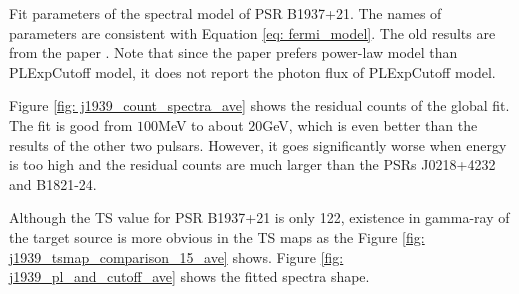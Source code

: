 \documentclass[12pt]{report}
\newcommand{\mycaption}[1]{\protect \caption{#1}}
\begin{document}
            \begin{table}[!ht]
              \centering
                \mycaption{Fit parameters of the spectral model of PSR B1937+21. 
                  The names of parameters are consistent with Equation
                  \ref{eq: fermi_model}. The old results are from the paper \cite{0004-637X-787-2-167}.
                  Note that since the paper prefers power-law model than PLExpCutoff model, it does not 
                  report the photon flux of PLExpCutoff model.}
                \label{table: j1939_fit_result_ave}        
            \end{table} 

            Figure \ref{fig: j1939_count_spectra_ave} shows the residual counts of the global fit.
            The fit is good from $100$MeV to about $20$GeV, which is even better than the results 
            of the other two pulsars. However, it goes significantly worse when energy is too 
            high and the residual counts are much larger than the PSRs J0218+4232 and B1821-24.

            Although the TS value for PSR B1937+21 is only 122, existence in gamma-ray of the 
            target source is more obvious in the TS maps as the Figure 
            \ref{fig: j1939_tsmap_comparison_15_ave} shows. Figure 
            \ref{fig: j1939_pl_and_cutoff_ave} shows the fitted spectra shape. 
\end{document}
